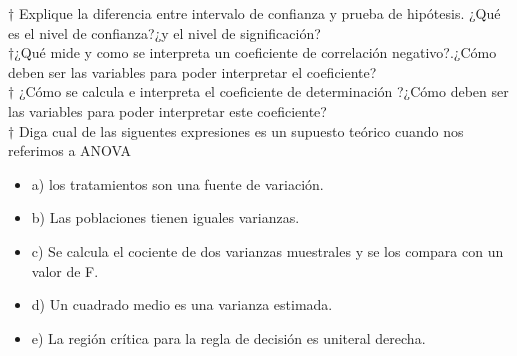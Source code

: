 \documentclass[10pt,a4paper]{article}
\begin{document}
$\dagger$ Explique la diferencia entre intervalo de confianza y prueba de hipótesis. ¿Qué es el nivel de confianza?¿y el nivel de significación?
\\
$\dagger$¿Qué mide y como se interpreta un coeficiente de correlación negativo?.¿Cómo deben ser las variables para poder interpretar el coeficiente?\\
$\dagger$ ¿Cómo se calcula e interpreta el coeficiente de determinación ?¿Cómo deben ser las variables para poder interpretar este coeficiente?\\
$\dagger$ Diga cual de las siguentes expresiones es un supuesto teórico cuando nos referimos a ANOVA
\begin{itemize}
	\item a) los tratamientos son una fuente de variación.
	\item b) Las poblaciones tienen iguales varianzas. 
	\item c) Se calcula el cociente de dos varianzas muestrales y se los compara con un valor de F.
	\item d) Un cuadrado medio es una varianza estimada.
	\item e) La región crítica para la regla de decisión es uniteral derecha.
\end{itemize}
\end{document}
